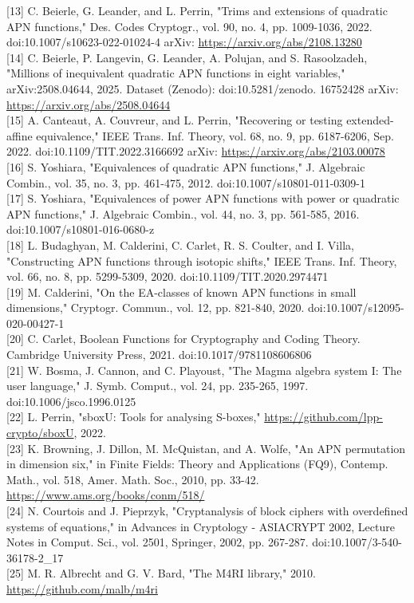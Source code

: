 \documentclass[10pt]{article}
\begin{document}
[13] C. Beierle, G. Leander, and L. Perrin, "Trims and extensions of quadratic APN functions," Des. Codes Cryptogr., vol. 90, no. 4, pp. 1009-1036, 2022. doi:10.1007/s10623-022-01024-4 arXiv: \href{https://arxiv.org/abs/2108.13280}{https://arxiv.org/abs/2108.13280}\\[0pt]
[14] C. Beierle, P. Langevin, G. Leander, A. Polujan, and S. Rasoolzadeh, "Millions of inequivalent quadratic APN functions in eight variables," arXiv:2508.04644, 2025. Dataset (Zenodo): doi:10.5281/zenodo. 16752428 arXiv: \href{https://arxiv.org/abs/2508.04644}{https://arxiv.org/abs/2508.04644}\\[0pt]
[15] A. Canteaut, A. Couvreur, and L. Perrin, "Recovering or testing extended-affine equivalence," IEEE Trans. Inf. Theory, vol. 68, no. 9, pp. 6187-6206, Sep. 2022. doi:10.1109/TIT.2022.3166692 arXiv: \href{https://arxiv.org/abs/2103.00078}{https://arxiv.org/abs/2103.00078}\\[0pt]
[16] S. Yoshiara, "Equivalences of quadratic APN functions," J. Algebraic Combin., vol. 35, no. 3, pp. 461-475, 2012. doi:10.1007/s10801-011-0309-1\\[0pt]
[17] S. Yoshiara, "Equivalences of power APN functions with power or quadratic APN functions," J. Algebraic Combin., vol. 44, no. 3, pp. 561-585, 2016. doi:10.1007/s10801-016-0680-z\\[0pt]
[18] L. Budaghyan, M. Calderini, C. Carlet, R. S. Coulter, and I. Villa, "Constructing APN functions through isotopic shifts," IEEE Trans. Inf. Theory, vol. 66, no. 8, pp. 5299-5309, 2020. doi:10.1109/TIT.2020.2974471\\[0pt]
[19] M. Calderini, "On the EA-classes of known APN functions in small dimensions," Cryptogr. Commun., vol. 12, pp. 821-840, 2020. doi:10.1007/s12095-020-00427-1\\[0pt]
[20] C. Carlet, Boolean Functions for Cryptography and Coding Theory. Cambridge University Press, 2021. doi:10.1017/9781108606806\\[0pt]
[21] W. Bosma, J. Cannon, and C. Playoust, "The Magma algebra system I: The user language," J. Symb. Comput., vol. 24, pp. 235-265, 1997. doi:10.1006/jsco.1996.0125\\[0pt]
[22] L. Perrin, "sboxU: Tools for analysing S-boxes," \href{https://github.com/lpp-crypto/sboxU}{https://github.com/lpp-crypto/sboxU}, 2022.\\[0pt]
[23] K. Browning, J. Dillon, M. McQuistan, and A. Wolfe, "An APN permutation in dimension six," in Finite Fields: Theory and Applications (FQ9), Contemp. Math., vol. 518, Amer. Math. Soc., 2010, pp. 33-42. \href{https://www.ams.org/books/conm/518/}{https://www.ams.org/books/conm/518/}\\[0pt]
[24] N. Courtois and J. Pieprzyk, "Cryptanalysis of block ciphers with overdefined systems of equations," in Advances in Cryptology - ASIACRYPT 2002, Lecture Notes in Comput. Sci., vol. 2501, Springer, 2002, pp. 267-287. doi:10.1007/3-540-36178-2\_17\\[0pt]
[25] M. R. Albrecht and G. V. Bard, "The M4RI library," 2010. \href{https://github.com/malb/m4ri}{https://github.com/malb/m4ri}
\end{document}
